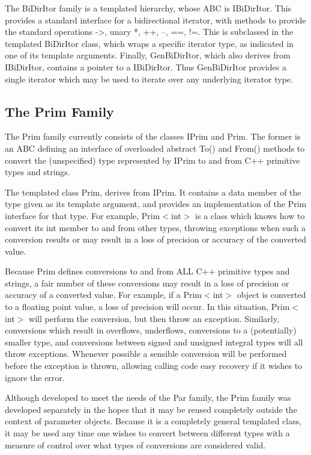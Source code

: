 The BiDirItor family is a templated hierarchy, whose
ABC is IBiDirItor. This provides a standard interface
for a bidirectional iterator, with methods to provide
the standard operations ->, unary *, ++, --, ==, !=. This is
subclassed in the templated BiDirItor class, which
wraps a specific iterator type, as indicated in one of its
template arguments. Finally, GenBiDirItor, which also derives
from IBiDirItor, contains a pointer to a IBiDirItor.
Thus GenBiDirItor provides a single iterator which may
be used to iterate over any underlying iterator type.

\subsection{The Prim Family}
The Prim family currently consists of the classes
IPrim and Prim. The former is an ABC defining
an interface of overloaded abstract To() and From() methods
to convert the (unspecified) type represented by IPrim 
to and from C++ primitive types and strings.

The templated class Prim, derives from IPrim. It contains
a data member of the type given as its template argument, and
provides an implementation of the Prim interface for that type.
For example, Prim$<$int$>$ is a class which knows how to convert
its int member to and from other types, throwing exceptions
when such a conversion results or may result in a loss
of precision or accuracy of the converted value.

Because Prim defines conversions to and from ALL
C++ primitive types and strings, a fair number of
these conversions may result in a loss of precision or
accuracy of a converted value. For example, if a Prim$<$int$>$
object is converted to a floating point value, a loss of
precision will occur. In this situation, Prim$<$int$>$ will perform
the conversion, but then throw an exception. Similarly,
conversions which result in overflows, underflows, conversions
to a (potentially) smaller type, and conversions between signed
and unsigned integral types will all throw exceptions. Whenever
possible a sensible conversion will be performed before the
exception is thrown, allowing calling code easy recovery if
it wishes to ignore the error.

Although developed to meet the needs of the Par family,
the Prim family was developed separately in the hopes that
it may be reused completely outside the context of parameter
objects. Because it is a completely general templated class,
it may be used any time one wishes to convert between different
types with a measure of control over what types of conversions
are considered valid.


